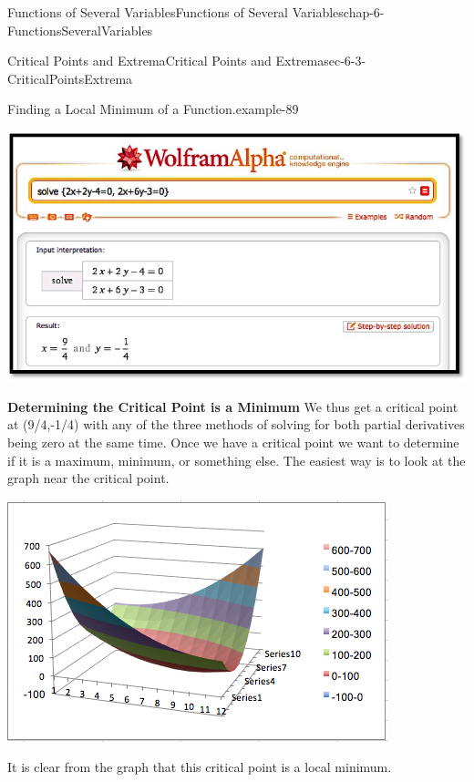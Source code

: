 \documentclass[oneside,10pt,]{book}
\newcommand{\terminology}[1]{\textbf{#1}}
\numberwithin{equation}{section}
\begin{document}
\begin{chapterptx}{Functions of Several Variables}{}{Functions of Several Variables}{}{}{chap-6-FunctionsSeveralVariables}
\begin{sectionptx}{Critical Points and Extrema}{}{Critical Points and Extrema}{}{}{sec-6-3-CriticalPointsExtrema}
\begin{example}{Finding a Local Minimum of a Function.}{example-89}
\begin{sidebyside}{1}{0.1}{0.1}{0}
\begin{sbspanel}{0.8}
\includegraphics[width=1\linewidth]{images/sec-6-3-4.png}
\end{sbspanel}%
\end{sidebyside}%
\par
\hypertarget{p-2341}{}%
\terminology{Determining the Critical Point is a Minimum} We thus get a critical point at (9\slash{}4,-1\slash{}4) with any of the three methods of solving for both partial derivatives being zero at the same time. Once we have a critical point we want to determine if it is a maximum, minimum, or something else.  The easiest way is to look at the graph near the critical point.%
\begin{sidebyside}{1}{0}{0}{0}%
\begin{sbspanel}{1}%
\includegraphics[width=1\linewidth]{images/sec-6-3-5.png}
\end{sbspanel}%
\end{sidebyside}%
\par
\hypertarget{p-2342}{}%
It is clear from the graph that this critical point is a local minimum.%
\end{example}

\end{sectionptx}
\end{chapterptx}
\end{document}
